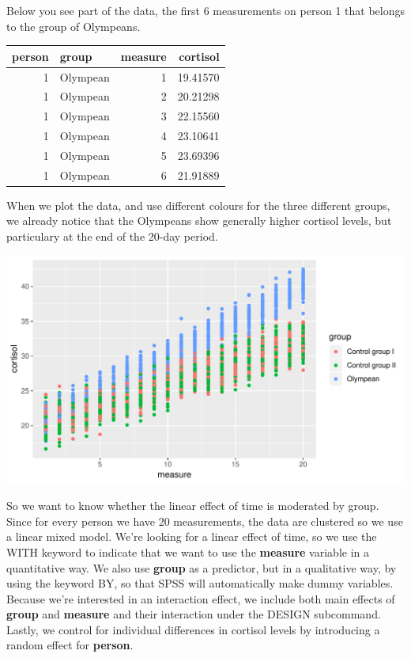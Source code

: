 \documentclass[]{report}\usepackage[]{graphicx}\usepackage[]{color}
\makeatletter
\def\maxwidth{ %
  \ifdim\Gin@nat@width>\linewidth
    \linewidth
  \else
    \Gin@nat@width
  \fi
}
\newenvironment{knitrout}{}{} %
\makeatother
\begin{document}
Below you see part of the data, the first 6 measurements on person 1 that belongs to the group of Olympeans.

\begin{knitrout}
\color{fgcolor}
\begin{tabular}{r|l|r|r}
\hline
person & group & measure & cortisol\\
\hline
1 & Olympean & 1 & 19.41570\\
\hline
1 & Olympean & 2 & 20.21298\\
\hline
1 & Olympean & 3 & 22.15560\\
\hline
1 & Olympean & 4 & 23.10641\\
\hline
1 & Olympean & 5 & 23.69396\\
\hline
1 & Olympean & 6 & 21.91889\\
\hline
\end{tabular}


\end{knitrout}

When we plot the data, and use different colours for the three different groups, we already notice that the Olympeans show generally higher cortisol levels, but particulary at the end of the 20-day period.



\begin{knitrout}
\color{fgcolor}

{\centering \includegraphics[width=\maxwidth]{figure/analysismixed20_2-1} 

}



\end{knitrout}

So we want to know whether the linear effect of time is moderated by group. Since for every person we have 20 measurements, the data are clustered so we use a linear mixed model. We're looking for a linear effect of time, so we use the WITH keyword to indicate that we want to use the \textbf{measure} variable in a quantitative way. We also use \textbf{group} as a predictor, but in a qualitative way, by using the keyword BY, so that SPSS will automatically make dummy variables. Because we're interested in an interaction effect, we include both main effects of \textbf{group} and \textbf{measure} and their interaction under the DESIGN subcommand. Lastly, we control for individual differences in cortisol levels by introducing a random effect for \textbf{person}.
\end{document}
